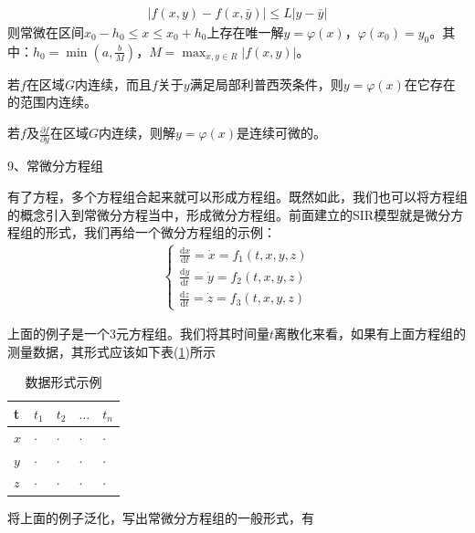 	  \begin{align*}
	  |f(x,y) - f(x,\bar{y})| \leqslant L|y - \bar{y}|
	  \end{align*}
	则常微在区间$x_0-h_0\leq x\leq x_0+h_0$上存在唯一解$y=\varphi(x)$，$\varphi(x_0)=y_0$。其中：$h_0=\min \left(a,\frac{b}{M}\right)$，$M=\max_{x,y\in R}|f(x,y)|$。
	\begin{theorem}[解对初值的连续性定理]
	若$f$在区域$G$内连续，而且$f$关于$y$满足局部利普西茨条件，则$y=\varphi (x)$在它存在的范围内连续。
	\end{theorem}
	\begin{theorem}[解对初值的可微性定理]
	若$f$及$\frac{\partial f}{\partial y}$在区域$G$内连续，则解$y=\varphi(x)$是连续可微的。
	\end{theorem}
	9、常微分方程组
	\par
	有了方程，多个方程组合起来就可以形成方程组。既然如此，我们也可以将方程组的概念引入到常微分方程当中，形成微分方程组。前面建立的SIR模型就是微分方程组的形式，我们再给一个微分方程组的示例：
	\begin{align*}
		\left\{
			\begin{aligned}
			\frac{\mathrm{d}x}{\mathrm{d}t} = \dot{x} = f_1(t,x,y,z) \\
			\frac{\mathrm{d}y}{\mathrm{d}t} = \dot{y} = f_2(t,x,y,z) \\
			\frac{\mathrm{d}z}{\mathrm{d}t} = \dot{z} = f_3(t,x,y,z)
			\end{aligned}
		\right.
	\end{align*}
	\par
	上面的例子是一个3元方程组。我们将其时间量$t$离散化来看，如果有上面方程组的测量数据，其形式应该如下表(\ref{数据形式示例})所示
	\begin{table}[htbp]
		\caption{数据形式示例}
		\label{数据形式示例}
		\centering
		\begin{tabular}{l|llll}
		\toprule
		t        & $t_1$     & $t_2$     &$\dots$  & $t_n$ \\
		\midrule
		$x $     & $\cdot$      & $\cdot$      & $\cdot$    & $\cdot$ \\
		$y $     & $\cdot$      & $\cdot$      & $\cdot$    & $\cdot$ \\
		$z $     & $\cdot$      & $\cdot$      & $\cdot$    & $\cdot$ \\
		\bottomrule
		\end{tabular}
	\end{table}
	\par
	将上面的例子泛化，写出常微分方程组的一般形式，有

